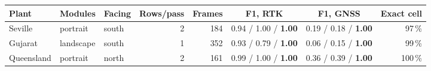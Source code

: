 \begin{tabular}{lllrrccr}
\toprule
Plant & Modules & Facing & Rows/pass & Frames & F1, RTK & F1, GNSS & Exact cell \\
\midrule
Seville & portrait & south & 2 & 184 & 0.94 / 1.00 / \textbf{1.00} & 0.19 / 0.18 / \textbf{1.00} & 97\,\% \\
Gujarat & landscape & south & 1 & 352 & 0.93 / 0.79 / \textbf{1.00} & 0.06 / 0.15 / \textbf{1.00} & 99\,\% \\
Queensland & portrait & north & 2 & 161 & 0.99 / 1.00 / \textbf{1.00} & 0.36 / 0.39 / \textbf{1.00} & 100\,\% \\
\bottomrule
\end{tabular}
